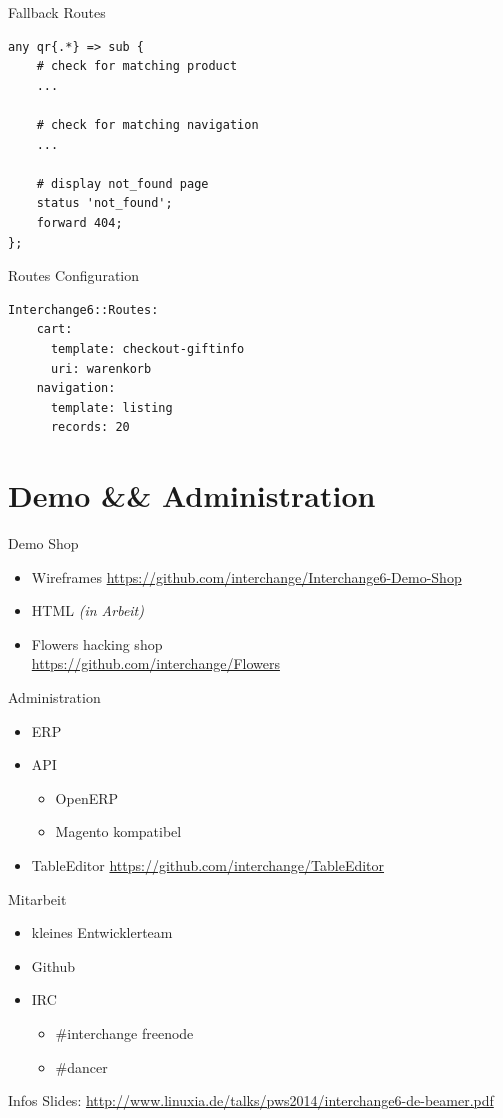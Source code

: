 \begin{frame}[fragile]{Fallback Routes}
\begin{lstlisting}
any qr{.*} => sub {
    # check for matching product
    ...

    # check for matching navigation
    ...

    # display not_found page
    status 'not_found';
    forward 404;
};
\end{lstlisting}
\end{frame}

\begin{frame}[fragile]{Routes Configuration}
\begin{lstlisting}
Interchange6::Routes:
    cart:
      template: checkout-giftinfo
      uri: warenkorb
    navigation:
      template: listing
      records: 20
\end{lstlisting}
\end{frame}

\section{Demo \&\& Administration}
\begin{frame}{Demo Shop}
\begin{itemize}
\item Wireframes
  \url{https://github.com/interchange/Interchange6-Demo-Shop}
\item HTML \textit{(in Arbeit)}
\item Flowers hacking shop \\
  \url{https://github.com/interchange/Flowers}
\end{itemize}
\end{frame}

\begin{frame}{Administration}
\begin{itemize}
\item ERP
\item API
\begin{itemize}
\item OpenERP
\item Magento kompatibel
\end{itemize}
\item TableEditor
\url{https://github.com/interchange/TableEditor}
\end{itemize}
\end{frame}

\begin{frame}{Mitarbeit}
\begin{itemize}
\item kleines Entwicklerteam
\item Github
\item IRC 
\begin{itemize}
\item \#interchange freenode
\item \#dancer
\end{itemize}
\end{itemize}
\end{frame}

\begin{frame}{Infos}
Slides:
\url{http://www.linuxia.de/talks/pws2014/interchange6-de-beamer.pdf}
\end{frame}



